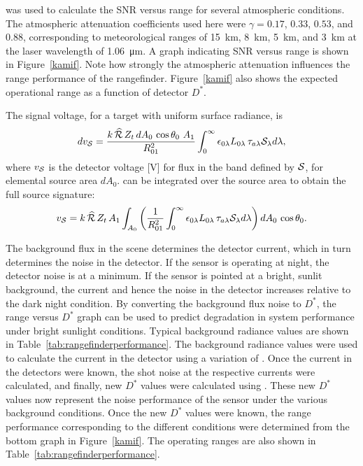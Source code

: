  was used to calculate the SNR versus range for several atmospheric conditions. The atmospheric attenuation coefficients used here\cite{EOHandbook1974} were $\gamma = 0.17$, $0.33$, $0.53$, and $0.88$, corresponding to meteorological ranges of 15~km, 8~km, 5~km, and 3~km at the laser wavelength of 1.06~\si{\micro\metre}{}.   A graph indicating SNR versus range is shown in Figure~\ref{kamif}. Note how strongly the atmospheric attenuation influences the range performance of the rangefinder. Figure~\ref{kamif} also shows the expected operational range as a function of detector $D^\ast$. 

The signal voltage, for a target with uniform surface radiance, is \cite{Willers2013} 
\begin{equation}
d v_{\cal S}=
\frac{k \,\widehat{{\cal R}}\, Z_t \,dA_{0}\,\cos\theta_0\,
\,A_{1} 
}{R_{01}^2}
\int_{0}^{\infty}
 \epsilon_{0\lambda} L_{0\lambda}
\,\tau_{a\lambda} {\cal S}_\lambda
d\lambda,
\label{eq:sensoroutputvoltage}
\end{equation}
where
$v_{\cal S}$ is the detector voltage [V] for flux in the band defined by ${\cal S}$, for elemental source area $dA_{0}$.   can be integrated over the source area to obtain the full source signature:
\begin{equation}
 v_{\cal S}=
 k \,\widehat{{\cal R}}\, Z_t\,A_{1} 
\int_{A_0} \left(
\frac{1}{R_{01}^2}
\int_{0}^{\infty}
 \epsilon_{0\lambda} L_{0\lambda}
\,\tau_{a\lambda} {\cal S}_\lambda
d\lambda\right) dA_{0}\,\cos\theta_0
.
\label{eq:sensoroutputvoltage1}
\end{equation}


The background flux in the scene determines the detector current, which in turn determines  the noise in the detector. If the sensor is operating at night, the detector noise is at a minimum. If the sensor is pointed at a bright, sunlit background, the current and hence the noise in the detector increases relative to the dark night condition.  By converting the background flux noise to $D^\ast$, the range versus $D^\ast$ graph can be used to predict degradation in system performance under bright sunlight conditions.  Typical background radiance values are shown in Table~\ref{tab:rangefinderperformance}. The background radiance values were used to calculate the current in the detector using a variation of .  Once the current in the detectors were known, the shot noise at the respective currents were calculated, and finally, new $D^\ast$ values were calculated using .  These new $D^\ast$ values now represent the noise performance of the sensor under the various background conditions. Once the new $D^\ast$ values were known, the range performance corresponding to the different conditions were determined from the bottom graph in Figure~\ref{kamif}.  The operating ranges are also shown in Table~\ref{tab:rangefinderperformance}.


